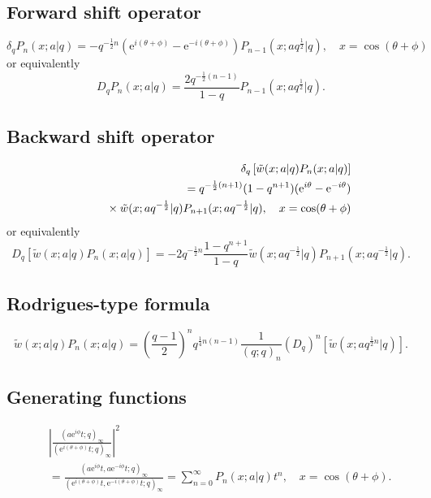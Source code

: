 \documentclass[envcountchap,graybox]{svmono}
\newcommand{\mathindent}{\hspace{7.5mm}}
\newcommand{\e}{\textrm{e}}
\begin{document}
\subsection*{Forward shift operator}
\begin{equation}
\label{shift1qMPI}
\delta_qP_n(x;a|q)=-q^{-\frac{1}{2}n}(\e^{i(\theta+\phi)}-\e^{-i(\theta+\phi)})
P_{n-1}(x;aq^{\frac{1}{2}}|q),\quad x=\cos(\theta+\phi)
\end{equation}
or equivalently
\begin{equation}
\label{shift1qMPII}
D_qP_n(x;a|q)=\frac{2q^{-\frac{1}{2}(n-1)}}{1-q}P_{n-1}(x;aq^{\frac{1}{2}}|q).
\end{equation}

\subsection*{Backward shift operator}
\begin{eqnarray}
\label{shift2qMPI}
& &\delta_q\left[{\tilde w}(x;a|q)P_n(x;a|q)\right]\nonumber\\
& &{}=q^{-\frac{1}{2}(n+1)}(1-q^{n+1})(\e^{i\theta}-\e^{-i\theta})\nonumber\\
& &{}\mathindent{}\times
{\tilde w}(x;aq^{-\frac{1}{2}}|q)P_{n+1}(x;aq^{-\frac{1}{2}}|q),\quad x=\cos(\theta+\phi)
\end{eqnarray}
or equivalently
\begin{equation}
\label{shift2qMPII}
D_q\left[{\tilde w}(x;a|q)P_n(x;a|q)\right]=
-2q^{-\frac{1}{2}n}\frac{1-q^{n+1}}{1-q}{\tilde w}(x;aq^{-\frac{1}{2}}|q)P_{n+1}(x;aq^{-\frac{1}{2}}|q).
\end{equation}

\subsection*{Rodrigues-type formula}
\begin{equation}
\label{RodqMP}
{\tilde w}(x;a|q)P_n(x;a|q)=\left(\frac{q-1}{2}\right)^n
q^{\frac{1}{4}n(n-1)}\frac{1}{(q;q)_n}\left(D_q\right)^n\left[{\tilde w}(x;aq^{\frac{1}{2}n}|q)\right].
\end{equation}

\subsection*{Generating functions}
\begin{eqnarray}
\label{GenqMP1}
& &\left|\frac{(a\e^{i\phi}t;q)_{\infty}}{(\e^{i(\theta+\phi)}t;q)_{\infty}}\right|^2\nonumber\\
& &{}=\frac{(a\e^{i\phi}t,a\e^{-i\phi}t;q)_{\infty}}{(\e^{i(\theta+\phi)}t,\e^{-i(\theta+\phi)}t;q)_{\infty}}
=\sum_{n=0}^{\infty}P_n(x;a|q)t^n,\quad x=\cos(\theta+\phi).
\end{eqnarray}
\end{document}
